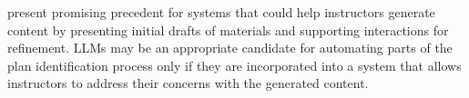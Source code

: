  present promising precedent for systems that could help instructors generate content by presenting initial drafts of materials and supporting interactions for refinement.  LLMs may be an appropriate candidate for automating parts of the plan identification process only if they are incorporated into a system that allows instructors to address their concerns with the generated content. 



